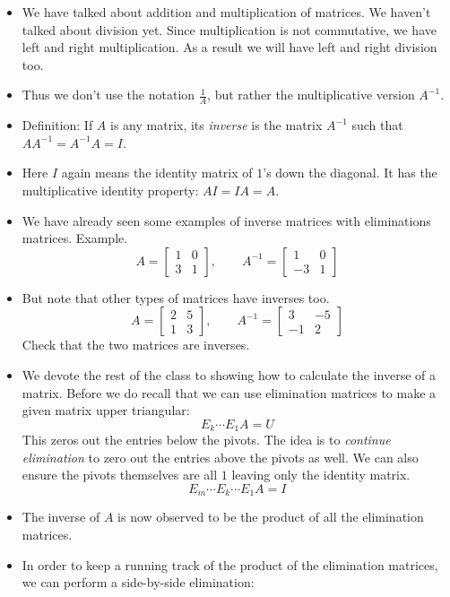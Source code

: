 \documentclass[11pt,oneside]{amsbook}
\theoremstyle{definition}
\theoremstyle{plain}
\theoremstyle{definition}
\theoremstyle{remark}
\numberwithin{equation}{section}
\numberwithin{figure}{section}
\begin{document}
\begin{itemize}
\item We have talked about addition and multiplication of matrices. We haven't talked about division yet. Since multiplication is not commutative, we have left and right multiplication. As a result we will have left and right division too.
\item Thus we don't use the notation $\frac1A$, but rather the multiplicative version $A^{-1}$.
\item Definition: If $A$ is any matrix, its \emph{inverse} is the matrix $A^{-1}$ such that $AA^{-1}=A^{-1}A=I$.
\item Here $I$ again means the identity matrix of $1$'s down the diagonal. It has the multiplicative identity property: $AI=IA=A$.
\item We have already seen some examples of inverse matrices with eliminations matrices. Example.
  \[A=\begin{bmatrix}1&0\\3&1\end{bmatrix},\qquad
    A^{-1}=\begin{bmatrix}1&0\\-3&1\end{bmatrix}
  \]
\item But note that other types of matrices have inverses too.
  \[A=\begin{bmatrix}2&5\\1&3\end{bmatrix},\qquad
    A^{-1}=\begin{bmatrix}3&-5\\-1&2\end{bmatrix}
  \]
  Check that the two matrices are inverses.
\item We devote the rest of the class to showing how to calculate the inverse of a matrix. Before we do recall that we can use elimination matrices to make a given matrix upper triangular:
  \[E_k\cdots E_1A=U
  \]
  This zeros out the entries below the pivots. The idea is to \emph{continue elimination} to zero out the entries above the pivots as well. We can also ensure the pivots themselves are all $1$ leaving only the identity matrix.
  \[E_m\cdots E_k\cdots E_1A=I
  \]
\item The inverse of $A$ is now observed to be the product of all the elimination matrices.
\item In order to keep a running track of the product of the elimination matrices, we can perform a side-by-side elimination:
  \begin{align*}

\end{align*}
\end{itemize}
\end{document}

